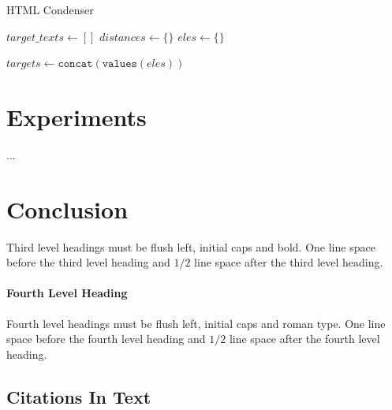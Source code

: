 \documentclass[a4paper]{article}
\begin{document}
\begin{algorithm}
  \SetAlgoLined
  \caption{HTML Condenser}
  
  $target\_texts \gets []$\;
  $distances \gets \{\}$\;
  $eles \gets \{\}$\;
  

  $targets \gets \texttt{concat}(\texttt{values}(eles))$\;

\end{algorithm}

\section{Experiments }

...

\section{Conclusion }

Third level headings must be flush left, initial caps and bold.
One line space before the third level heading and $1/2$ line
space after the third level heading.

\paragraph{Fourth Level Heading}

Fourth level headings must be flush left, initial caps and roman type.
One line space before the fourth level heading and $1/2$ line
space after the fourth level heading.

\subsection{Citations In Text}
\end{document}
